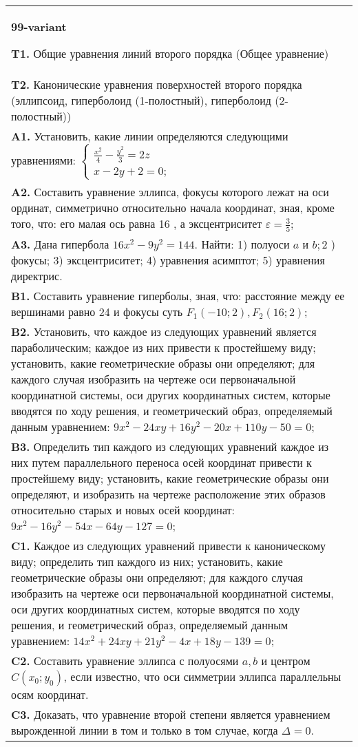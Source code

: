 \documentclass{article}
\begin{document}
\begin{tabular}{m{17cm}}
\textbf{99-variant}
\newline

\textbf{T1.} Общие уравнения линий второго порядка (Общее уравнение) \\
\textbf{T2.} Канонические уравнения поверхностей второго порядка (эллипсоид, гиперболоид (1-полостный), гиперболоид (2-полостный)) \\
\textbf{A1.} Установить, какие линии определяются следующими уравнениями: $\left\{\begin{array}{l}\frac{x^2}{4}-\frac{y^2}{3}=2 z \\ x-2 y+2=0 ;\end{array}\right.$ \\
\textbf{A2.} Составить уравнение эллипса, фокусы которого лежат на оси ординат, симметрично относительно начала координат, зная, кроме того, что: его малая ось равна 16 , а эксцентриситет $\varepsilon=\frac{3}{5}$; \\
\textbf{A3.} Дана гипербола $16 x^2-9 y^2=144$. Найти: 1) полуоси $a$ и $b ; 2$ ) фокусы; 3) эксцентриситет; 4) уравнения асимптот; 5) уравнения директрис. \\
\textbf{B1.} Составить уравнение гиперболы, зная, что: расстояние между ее вершинами равно 24 и фокусы суть $F_1(-10 ; 2), F_2(16 ; 2)$; \\
\textbf{B2.} Установить, что каждое из следующих уравнений является параболическим; каждое из них привести к простейшему виду; установить, какие геометрические образы они определяют; для каждого случая изобразить на чертеже оси первоначальной координатной системы, оси других координатных систем, которые вводятся по ходу решения, и геометрический образ, определяемый данным уравнением: $9 x^2-24 x y+16 y^2-20 x+110 y-50=0$; \\
\textbf{B3.} Определить тип каждого из следующих уравнений каждое из них путем параллельного переноса осей координат привести к простейшему виду; установить, какие геометрические образы они определяют, и изобразить на чертеже расположение этих образов относительно старых и новых осей координат: $9 x^2-16 y^2-54 x-64 y-127=0$; \\
\textbf{C1.} Каждое из следующих уравнений привести к каноническому виду; определить тип каждого из них; установить, какие геометрические образы они определяют; для каждого случая изобразить на чертеже оси первоначальной координатной системы, оси других координатных систем, которые вводятся по ходу решения, и геометрический образ, определяемый данным уравнением: $14 x^2+24 x y+21 y^2-4 x+18 y-139=0$; \\
\textbf{C2.} Составить уравнение эллипса с полуосями $a, b$ и центром $C\left(x_0 ; y_0\right)$, если известно, что оси симметрии эллипса параллельны осям координат. \\
\textbf{C3.} Доказать, что уравнение второй степени является уравнением вырожденной линии в том и только в том случае, когда $\Delta=0$. \\

\end{tabular}
\vspace{1cm}
\end{document}
